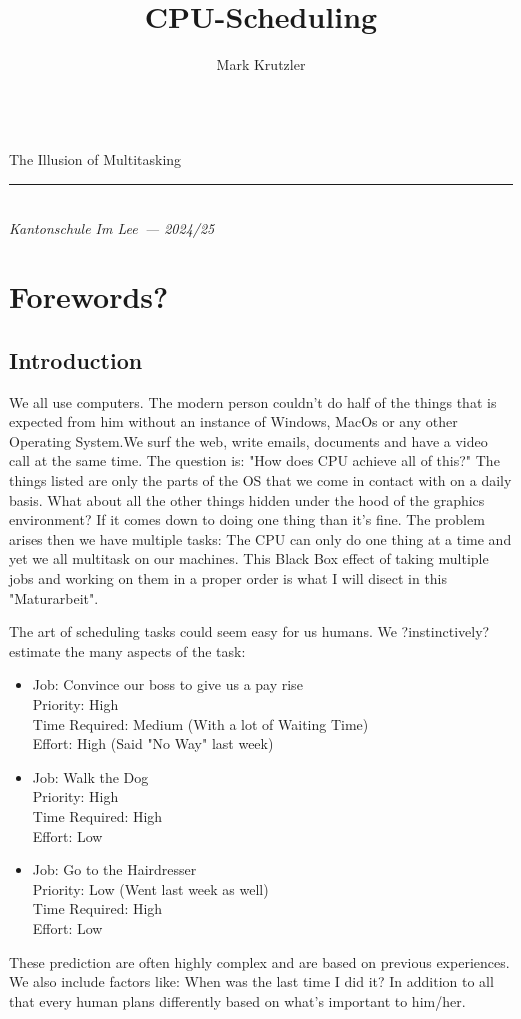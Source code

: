 \documentclass{report}
\title{CPU-Scheduling}
\author{Mark Krutzler}
\newcommand{\thesubtitle}{The Illusion of Multitasking}
\newcommand{\currentdate}{2024/25}
\newcommand{\auinstitution}{Kantonschule Im Lee}
\renewcommand{\maketitle}{
\begin{center}


{\Huge\bfseries
\thetitle}
\vspace{0.5em}\\
{\LARGE\thesubtitle}


{\rule{0.4\textwidth}{.4pt}}

{\bfseries \theauthor}\\
\textit{\auinstitution \ --- \currentdate}
\end{center}
}
\begin{document}
\begin{titlepage}
\vspace*{\fill}
\centering
\maketitle
\vspace*{\fill}
\end{titlepage}

\tableofcontents



\part{Forewords?}

\chapter*{Introduction}

We all use computers.
The modern person couldn't do half of the things that is expected from him without an instance of Windows, MacOs or any other Operating System.We surf the web, write emails, documents and have a video call at the same time.
The question is: "How does CPU achieve all of this?" The things listed are only the parts of the OS that we come in contact with on a daily basis.
What about all the other things hidden under the hood of the graphics environment? If it comes down to doing one thing than it's fine.
The problem arises then we have multiple tasks: The CPU can only do one thing at a time and yet we all multitask on our machines.
This Black Box effect of taking multiple jobs and working on them in a proper order is what I will disect in this "Maturarbeit".

The art of scheduling tasks could seem easy for us humans.
We ?instinctively? estimate the many aspects of the task:
\begin{itemize}
\item Job: Convince our boss to give us a pay rise\\Priority: High\\Time Required: Medium (With a lot of Waiting Time)\\Effort: High (Said "No Way" last week)
\item Job: Walk the Dog\\Priority: High\\Time Required: High\\Effort: Low
\item Job: Go to the Hairdresser\\ Priority: Low (Went last week as well)\\Time Required: High\\Effort: Low
\end{itemize}
These prediction are often highly complex and are based on previous experiences.
We also include factors like: When was the last time I did it?
In addition to all that every human plans differently based on what's important to him/her.
\end{document}
